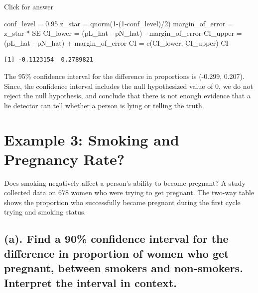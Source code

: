 \documentclass[
]{book}
\newenvironment{Shaded}{\begin{snugshade}}{\end{snugshade}}
\newcommand{\DecValTok}[1]{\textcolor[rgb]{0.00,0.00,0.81}{#1}}
\newcommand{\FloatTok}[1]{\textcolor[rgb]{0.00,0.00,0.81}{#1}}
\newcommand{\FunctionTok}[1]{\textcolor[rgb]{0.00,0.00,0.00}{#1}}
\newcommand{\NormalTok}[1]{#1}
\newcommand{\OtherTok}[1]{\textcolor[rgb]{0.56,0.35,0.01}{#1}}
\newcommand{\SpecialCharTok}[1]{\textcolor[rgb]{0.00,0.00,0.00}{#1}}
\begin{document}
Click for answer

\begin{Shaded}
\begin{Highlighting}[]
\NormalTok{conf\_level }\OtherTok{=} \FloatTok{0.95}
\NormalTok{z\_star }\OtherTok{=} \FunctionTok{qnorm}\NormalTok{(}\DecValTok{1}\SpecialCharTok{{-}}\NormalTok{(}\DecValTok{1}\SpecialCharTok{{-}}\NormalTok{conf\_level)}\SpecialCharTok{/}\DecValTok{2}\NormalTok{)}
\NormalTok{margin\_of\_error }\OtherTok{=}\NormalTok{ z\_star }\SpecialCharTok{*}\NormalTok{ SE}
\NormalTok{CI\_lower }\OtherTok{=}\NormalTok{ (pL\_hat }\SpecialCharTok{{-}}\NormalTok{ pN\_hat) }\SpecialCharTok{{-}}\NormalTok{ margin\_of\_error}
\NormalTok{CI\_upper }\OtherTok{=}\NormalTok{ (pL\_hat }\SpecialCharTok{{-}}\NormalTok{ pN\_hat) }\SpecialCharTok{+}\NormalTok{ margin\_of\_error}
\NormalTok{CI }\OtherTok{=} \FunctionTok{c}\NormalTok{(CI\_lower, CI\_upper)}
\NormalTok{CI}
\end{Highlighting}
\end{Shaded}

\begin{verbatim}
[1] -0.1123154  0.2789821
\end{verbatim}

The 95\% confidence interval for the difference in proportions is (-0.299, 0.207). Since, the confidence interval includes the null hypothesized value of 0, we do not reject the null hypothesis, and conclude that there is not enough evidence that a lie detector can tell whether a person is lying or telling the truth.

\hypertarget{example-3-smoking-and-pregnancy-rate}{%
\section{Example 3: Smoking and Pregnancy Rate?}\label{example-3-smoking-and-pregnancy-rate}}

Does smoking negatively affect a person's ability to become pregnant? A study collected data on 678 women who were trying to get pregnant. The two-way table shows the proportion who successfully became pregnant during the first cycle trying and smoking status.

\hypertarget{a.-find-a-90-confidence-interval-for-the-difference-in-proportion-of-women-who-get-pregnant-between-smokers-and-non-smokers.-interpret-the-interval-in-context.}{%
\subsection{(a). Find a 90\% confidence interval for the difference in proportion of women who get pregnant, between smokers and non-smokers. Interpret the interval in context.}\label{a.-find-a-90-confidence-interval-for-the-difference-in-proportion-of-women-who-get-pregnant-between-smokers-and-non-smokers.-interpret-the-interval-in-context.}}
\end{document}
